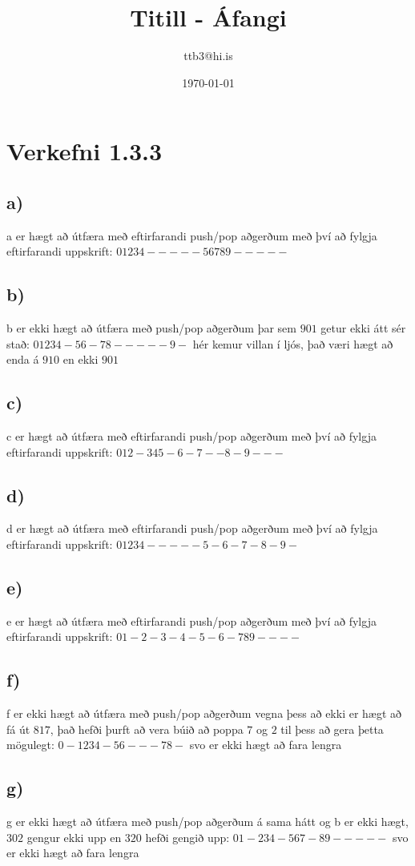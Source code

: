 \documentclass{article}
\title{Titill - Áfangi}
\author{ttb3@hi.is}
\date{\today}
\begin{document}
\maketitle


\section*{Verkefni 1.3.3}
\subsection*{a)}
a er hægt að útfæra með eftirfarandi push/pop aðgerðum með því að fylgja eftirfarandi uppskrift:
$01234-----56789-----$

\subsection*{b)}
b er ekki hægt að útfæra með push/pop aðgerðum þar sem $901$ getur ekki átt sér stað:
$01234-56-78-----9-$ hér kemur villan í ljós, það væri hægt að enda á $910$ en ekki $901$

\subsection*{c)}
c er hægt að útfæra með eftirfarandi push/pop aðgerðum með því að fylgja eftirfarandi uppskrift:
$012-345-6-7--8-9---$

\subsection*{d)}
d er hægt að útfæra með eftirfarandi push/pop aðgerðum með því að fylgja eftirfarandi uppskrift:
$01234-----5-6-7-8-9-$

\subsection*{e)}
e er hægt að útfæra með eftirfarandi push/pop aðgerðum með því að fylgja eftirfarandi uppskrift:
$01-2-3-4-5-6-789----$

\subsection*{f)}
f er ekki hægt að útfæra með push/pop aðgerðum vegna þess að ekki er hægt að fá út $817$, það hefði þurft að vera búið að poppa $7$ og $2$ til þess að gera þetta mögulegt:
$0-1234-56---78-$ svo er ekki hægt að fara lengra

\subsection*{g)}
g er ekki hægt að útfæra með push/pop aðgerðum á sama hátt og b er ekki hægt, $302$ gengur ekki upp en $320$ hefði gengið upp:
$01-234-567-89-----$ svo er ekki hægt að fara lengra
\end{document}
